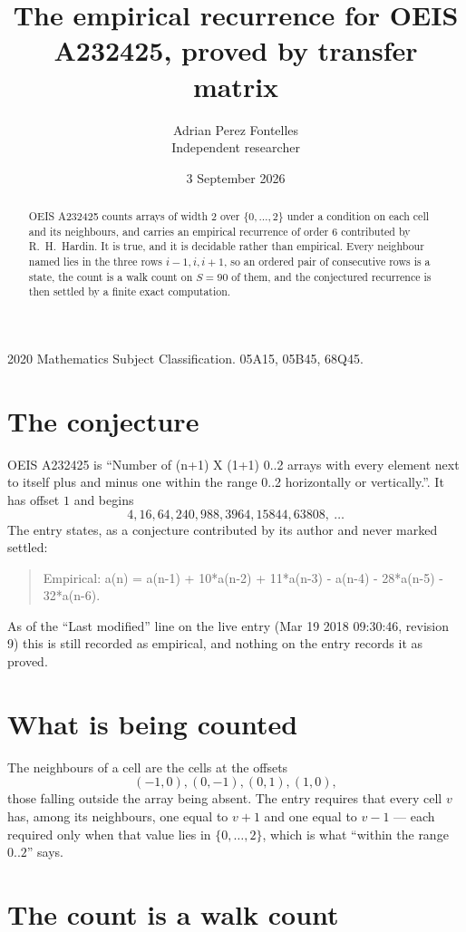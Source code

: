 \documentclass[11pt,a4paper]{article}
\title{The empirical recurrence for OEIS A232425, proved by transfer matrix}
\author{Adrian Perez Fontelles\\ \small Independent researcher}
\date{3 September 2026}
\theoremstyle{plain}
\theoremstyle{definition}
\begin{document}
\maketitle

\begin{abstract}
OEIS A232425 counts arrays of width $2$ over $\{0,\dots,2\}$ under a condition on each cell
and its neighbours, and carries an empirical recurrence of order $6$ contributed by
R.~H.~Hardin. It is true, and it is decidable rather than empirical. Every neighbour named lies
in the three rows $i-1,i,i+1$, so an ordered pair of consecutive rows is a state, the count is
a walk count on $S=90$ of them, and the conjectured recurrence is then settled by a finite
exact computation.
\end{abstract}

\noindent\small 2020 Mathematics Subject Classification. 05A15, 05B45, 68Q45.\normalsize

\section{The conjecture}

OEIS A232425 is ``Number of (n+1) X (1+1) 0..2 arrays with every element next to itself plus and minus one within the range 0..2 horizontally or vertically.''. It has offset $1$ and begins
\[
4, 16, 64, 240, 988, 3964, 15844, 63808,\ \dots
\]
The entry states, as a conjecture contributed by its author and never marked settled:
\begin{quote}
Empirical: a(n) = a(n-1) + 10*a(n-2) + 11*a(n-3) - a(n-4) - 28*a(n-5) - 32*a(n-6).
\end{quote}
As of the ``Last modified'' line on the live entry (Mar 19 2018 09:30:46, revision 9) this is still
recorded as empirical, and nothing on the entry records it as proved.

\section{What is being counted}

The neighbours of a cell are the cells at the offsets
\[
(-1,0), (0,-1), (0,1), (1,0),
\]
those falling outside the array being absent. The entry requires that every cell $v$ has, among its neighbours, one equal to $v+1$ and one equal to $v-1$ --- each required only when that value lies in $\{0,\dots,2\}$, which is what ``within the range $0..2$'' says.

\section{The count is a walk count}
\end{document}

